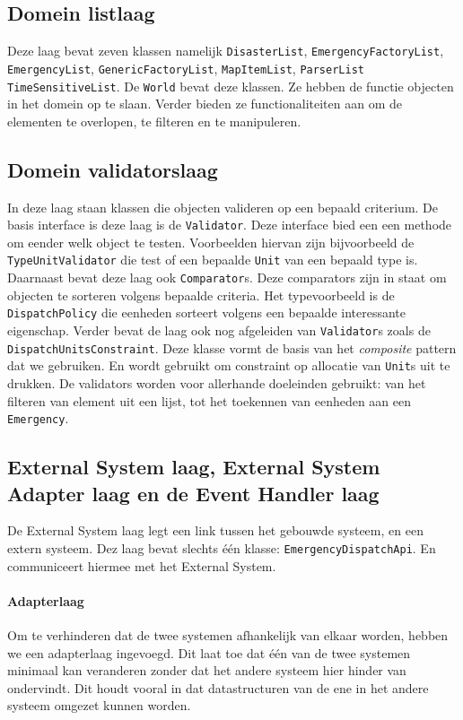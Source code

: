 \subsection{Domein listlaag}
Deze laag bevat zeven klassen namelijk \texttt{Disaster\-List}, \texttt{Emergency\-Factory\-List}, \texttt{Emergency\-List}, \texttt{Generic\-Factory\-List}, \texttt{Map\-Item\-List}, \texttt{Parser\-List} \texttt{Time\-Sensitive\-List}. De \texttt{World} bevat deze klassen. Ze hebben de functie objecten in het domein op te slaan. Verder bieden ze functionaliteiten aan om de elementen te overlopen, te filteren en te manipuleren.

\subsection{Domein validatorslaag}
In deze laag staan klassen die objecten valideren op een bepaald criterium. De basis interface is deze laag is de \texttt{Validator}. Deze interface bied een een methode om eender welk object te testen. Voorbeelden hiervan zijn bijvoorbeeld de \texttt{TypeUnitValidator} die test of een bepaalde \texttt{Unit} van een bepaald type is. Daarnaast bevat deze laag ook \texttt{Comparator}s. Deze comparators zijn in staat om objecten te sorteren volgens bepaalde criteria. Het typevoorbeeld is de \texttt{DispatchPolicy} die eenheden sorteert volgens een bepaalde interessante eigenschap. Verder bevat de laag ook nog afgeleiden van \texttt{Validator}s zoals de \texttt{DispatchUnitsConstraint}. Deze klasse vormt de basis van het \textit{composite} pattern dat we gebruiken. En wordt gebruikt om constraint op allocatie van \texttt{Unit}s uit te drukken. De validators worden voor allerhande doeleinden gebruikt: van het filteren van element uit een lijst, tot het toekennen van eenheden aan een \texttt{Emergency}.

\subsection{External System laag, External System Adapter laag en de Event Handler laag}
De External System laag legt een link tussen het gebouwde systeem, en een extern systeem. Dez laag bevat slechts \'e\'en klasse: \texttt{EmergencyDispatchApi}. En communiceert hiermee met het External System.
\paragraph{Adapterlaag}
Om te verhinderen dat de twee systemen afhankelijk van elkaar worden, hebben we een adapterlaag ingevoegd. Dit laat toe dat \'e\'en van de twee systemen minimaal kan veranderen zonder dat het andere systeem hier hinder van ondervindt. Dit houdt vooral in dat datastructuren van de ene in het andere systeem omgezet kunnen worden.
